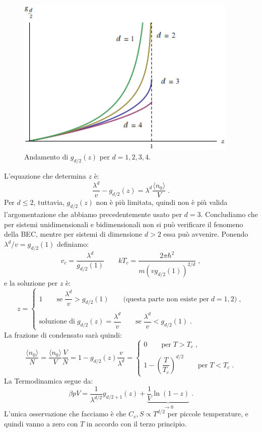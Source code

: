 \documentclass[10pt,a4paper]{report}
\theoremstyle{definition}
\numberwithin{equation}{section}
\newcommand{\bra}{\langle}
\newcommand{\ket}{\rangle}
\begin{document}
\begin{figure}[h]
\centering
\includegraphics[width=300pt,keepaspectratio=true]{Addons/bosefunctions}
\caption{\footnotesize{Andamento di $g_{d/2}(z)$ per $d=1,2,3,4$.}}
\end{figure}
\pagebreak
L'equazione che determina $z$ è:
\begin{equation}
\frac{\lambda^d}{v}-g_{d/2}(z)=\lambda^d\frac{\bra n_0\ket}{V}\;.
\end{equation}
Per $d\le 2$, tuttavia, $g_{d/2}(z)$ non è più limitata, quindi non è più valida l'argomentazione che abbiamo precedentemente usato per $d=3$. Concludiamo che per sistemi unidimensionali e bidimensionali non si può verificare il fenomeno della BEC, mentre per sistemi di dimensione $d>2$ essa può avvenire. Ponendo $\lambda^d/v=g_{d/2}(1)$ definiamo:
\begin{equation}
v_c=\frac{\lambda^d}{g_{d/2}(1)}\qquad kT_c=\frac{2\pi\hbar^2}{m(vg_{d/2}(1))^{2/d}}\;,
\end{equation}
e la soluzione per $z$ è:
\begin{equation}
z=\begin{cases}
1\qquad \mbox{se}\; \dfrac{\lambda^d}{v}>g_{d/2}(1)\qquad \mbox{(questa parte non esiste per}\; d=1,2)\;, \\
\\
\mbox{soluzione di}\; g_{d/2}(z)=\dfrac{\lambda^d}{v}\qquad \mbox{se}\; \dfrac{\lambda^d}{v}<g_{d/2}(1)\;.
\end{cases}
\end{equation}
La frazione di condensato sarà quindi:
\begin{equation}
\frac{\bra n_0\ket}{N}=\frac{\bra n_0\ket}{V}\frac{V}{N}=1-g_{d/2}(z)\frac{v}{\lambda^d}=\begin{cases}
0\qquad \mbox{per}\; T>T_c\;, \\
\\
1-\left(\dfrac{T}{T_c}\right)^{d/2}\qquad \mbox{per}\; T<T_c\;.
\end{cases}
\end{equation}
La Termodinamica segue da:
$$
\beta pV=\frac{1}{\lambda^{d/2}}g_{d/2+1}(z)+\underbrace{\frac{1}{V}\ln(1-z)}_{\to 0}\;.
$$
L'unica osservazione che facciamo è che $C_v,S\propto T^{d/2}$ per piccole temperature, e quindi vanno a zero con $T$ in accordo con il terzo principio.
\end{document}

